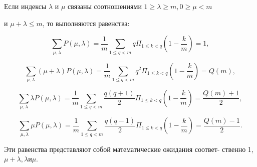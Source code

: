 \begin{lemma}
\slshape{Если индексы $\lambda$ и $\mu$ связаны соотношениями $1 \geqslant  \lambda \geqslant m, 0 \geqslant \mu < m$ \linebreak \newpage 


и $\mu + \lambda \leqslant m$, то выполняются равенства:} \par
 
$$\sum_{\mu,\lambda} P(\mu,\lambda) = \frac{1}{m} \sum_{1 \leqslant q < m} q \Pi_{1 \leqslant k < q} (1 - \frac{k}{m}) = 1,$$ \par 

$$\sum_{\mu,\lambda} (\mu + \lambda) P(\mu,\lambda) = \frac{1}{m} \sum_{1 \leqslant q < m} q^{2} \Pi_{1 \leqslant k < q} (1 - \frac{k}{m}) = Q(m),$$ \par 

$$\sum_{\mu,\lambda} \lambda P(\mu,\lambda) = \frac{1}{m} \sum_{1 \leqslant q < m} \frac{q(q+1)}{2} \Pi_{1 \leqslant k < q} (1 - \frac{k}{m}) = \frac{Q(m)+1}{2},$$ \par 

$$\sum_{\mu,\lambda} \mu P(\mu,\lambda) = \frac{1}{m} \sum_{1 \leqslant q < m} \frac{q(q-1)}{2} \Pi_{1 \leqslant k < q} (1 - \frac{k}{m}) = \frac{Q(m)-1}{2}.$$ \par

\noindent Эти равенства представляют собой математические ожидания соответ- \linebreak ственно 1, $\mu + \lambda, \lambda и \mu$. \par
\end{lemma}

